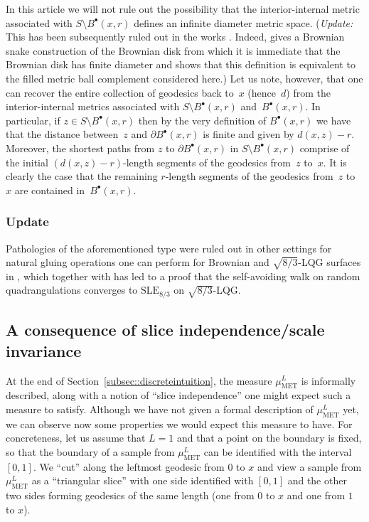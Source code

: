 \documentclass[JEP,XML,SOM,Unicode]{cedram}
\newcommand{\sbullet}{{\scriptscriptstyle\bullet}}
\theoremstyle{plain}
\numberwithin{theorem}{section}
\theoremstyle{definition}
\newcommand{\SLE}{\mathrm{SLE}}
\newcommand{\muml}{\mu_{\mathrm{MET}}^L}
\newcommand{\fb}[2]{B^\sbullet(#1,#2)}
\begin{document}
In this article we will not rule out the possibility that the interior-internal metric associated with $S \setminus \fb{x}{r}$ defines an infinite diameter metric space. (\emph{Update:} This has been subsequently ruled out in the works \cite{bettinelli_miermont_disks,lg2019disksnake}. Indeed, \cite{bettinelli_miermont_disks} gives a Brownian snake construction of the Brownian disk from which it is immediate that the Brownian disk has finite diameter and \cite{lg2019disksnake} shows that this definition is equivalent to the filled metric ball complement considered here.) Let us note, however, that one can recover the entire collection of geodesics back to~$x$ (hence~$d$) from the interior-internal metrics associated with $S \setminus \fb{x}{r}$ and~$\fb{x}{r}$. In particular, if $z \in S \setminus \fb{x}{r}$ then by the very definition of $\fb{x}{r}$ we have that the distance between~$z$ and $\partial \fb{x}{r}$ is finite and given by $d(x,z)-r$. Moreover, the shortest paths from $z$ to $\partial \fb{x}{r}$ in $S \setminus \fb{x}{r}$ comprise of the initial $(d(x,z)-r)$-length segments of the geodesics from~$z$ to~$x$. It is clearly the case that the remaining $r$-length segments of the geodesics from~$z$ to~$x$ are contained in~$\fb{x}{r}$.

\subsubsection*{Update} Pathologies of the aforementioned type were ruled out in other settings for natural gluing operations one can perform for Brownian and $\sqrt{8/3}$-LQG surfaces in \cite{gwynne-miller:gluing}, which together with \cite{gwynne-miller:saw,gwynne-miller:uihpq} has led to a proof that the self-avoiding walk on random quadrangulations converges to $\SLE_{8/3}$ on $\sqrt{8/3}$-LQG.

\subsection{A consequence of slice independence/scale invariance}
\label{subsec::slice_independence}

At the end of Section~\ref{subsec::discreteintuition}, the measure $\muml$ is informally described, along with a notion of ``slice independence'' one might expect such a measure to satisfy. Although we have not given a formal description of $\muml$ yet, we can observe now some properties we would expect this measure to have. For concreteness, let us assume that $L=1$ and that a point on the boundary is fixed, so that the boundary of a sample from $\muml$ can be identified with the interval $[0,1]$. We ``cut'' along the leftmost geodesic from $0$ to $x$ and view a sample from $\muml$ as a ``triangular slice'' with one side identified with $[0,1]$ and the other two sides forming geodesics of the same length (one from $0$ to $x$ and one from $1$ to $x$).
\end{document}
